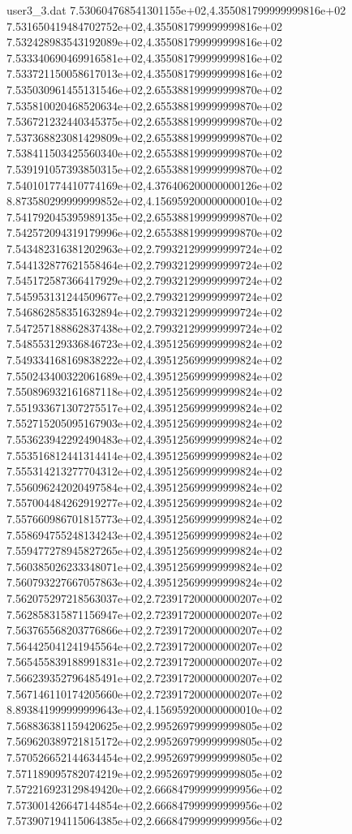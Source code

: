 \begin{filecontents}{user3_3.dat}
7.530604768541301155e+02,4.355081799999999816e+02
7.531650419484702752e+02,4.355081799999999816e+02
7.532428983543192089e+02,4.355081799999999816e+02
7.533340690469916581e+02,4.355081799999999816e+02
7.533721150058617013e+02,4.355081799999999816e+02
7.535030961455131546e+02,2.655388199999999870e+02
7.535810020468520634e+02,2.655388199999999870e+02
7.536721232440345375e+02,2.655388199999999870e+02
7.537368823081429809e+02,2.655388199999999870e+02
7.538411503425560340e+02,2.655388199999999870e+02
7.539191057393850315e+02,2.655388199999999870e+02
7.540101774410774169e+02,4.376406200000000126e+02
8.873580299999999852e+02,4.156959200000000010e+02
7.541792045395989135e+02,2.655388199999999870e+02
7.542572094319179996e+02,2.655388199999999870e+02
7.543482316381202963e+02,2.799321299999999724e+02
7.544132877621558464e+02,2.799321299999999724e+02
7.545172587366417929e+02,2.799321299999999724e+02
7.545953131244509677e+02,2.799321299999999724e+02
7.546862858351632894e+02,2.799321299999999724e+02
7.547257188862837438e+02,2.799321299999999724e+02
7.548553129336846723e+02,4.395125699999999824e+02
7.549334168169838222e+02,4.395125699999999824e+02
7.550243400322061689e+02,4.395125699999999824e+02
7.550896932161687118e+02,4.395125699999999824e+02
7.551933671307275517e+02,4.395125699999999824e+02
7.552715205095167903e+02,4.395125699999999824e+02
7.553623942292490483e+02,4.395125699999999824e+02
7.553516812441314414e+02,4.395125699999999824e+02
7.555314213277704312e+02,4.395125699999999824e+02
7.556096242020497584e+02,4.395125699999999824e+02
7.557004484262919277e+02,4.395125699999999824e+02
7.557660986701815773e+02,4.395125699999999824e+02
7.558694755248134243e+02,4.395125699999999824e+02
7.559477278945827265e+02,4.395125699999999824e+02
7.560385026233348071e+02,4.395125699999999824e+02
7.560793227667057863e+02,4.395125699999999824e+02
7.562075297218563037e+02,2.723917200000000207e+02
7.562858315871156947e+02,2.723917200000000207e+02
7.563765568203776866e+02,2.723917200000000207e+02
7.564425041241945564e+02,2.723917200000000207e+02
7.565455839188991831e+02,2.723917200000000207e+02
7.566239352796485491e+02,2.723917200000000207e+02
7.567146110174205660e+02,2.723917200000000207e+02
8.893841999999999643e+02,4.156959200000000010e+02
7.568836381159420625e+02,2.995269799999999805e+02
7.569620389721815172e+02,2.995269799999999805e+02
7.570526652144634454e+02,2.995269799999999805e+02
7.571189095782074219e+02,2.995269799999999805e+02
7.572216923129849420e+02,2.666847999999999956e+02
7.573001426647144854e+02,2.666847999999999956e+02
7.573907194115064385e+02,2.666847999999999956e+02

\end{filecontents}
